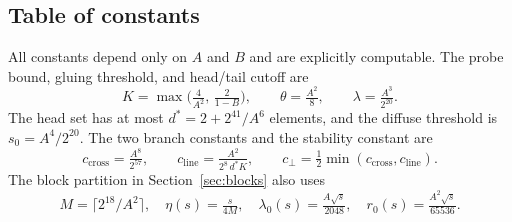 \subsection{Table of constants}\label{sec:constants}

All constants depend only on $A$ and $B$ and are explicitly computable.
The probe bound, gluing threshold, and head/tail cutoff are
\[
K = \max\!\bigl(\tfrac{4}{A^2},\,\tfrac{2}{1-B}\bigr),
\qquad
\theta = \tfrac{A^2}{8},
\qquad
\lambda = \tfrac{A^3}{2^{20}}.
\]
The head set has at most $d^* = 2 + 2^{41}/A^6$ elements, and the
diffuse threshold is $s_0 = A^4/2^{20}$. The two branch constants and
the stability constant are
\[
c_{\mathrm{cross}} = \tfrac{A^8}{2^{57}},
\qquad
c_{\mathrm{line}} = \tfrac{A^2}{2^8\, d^*\! K},
\qquad
c_\perp = \tfrac{1}{2}
\min(c_{\mathrm{cross}}, c_{\mathrm{line}}).
\]
The block partition in Section~\ref{sec:blocks} also uses
\[
M = \lceil 2^{18}/A^2 \rceil,
\quad
\eta(s) = \tfrac{s}{4M},
\quad
\lambda_0(s) = \tfrac{A\sqrt{s}}{2048},
\quad
r_0(s) = \tfrac{A^2\sqrt{s}}{65536}.
\]\label{sec:constants-end}
